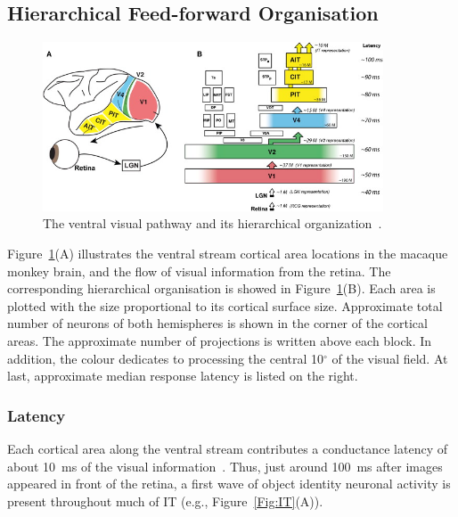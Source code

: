 \subsection{Hierarchical Feed-forward Organisation }

\begin{figure}[h!]
	\centering
	\includegraphics[width=0.9\textwidth]{pics/ventral.jpg}
	\caption{The ventral visual pathway and its hierarchical organization~\cite{dicarlo2012does}.
}
	\label{Fig:Ventral}
\end{figure}
Figure~\ref{Fig:Ventral}(A) illustrates the ventral stream cortical area locations in the macaque monkey brain, and the flow of visual information from the retina.
The corresponding hierarchical organisation is showed in Figure~\ref{Fig:Ventral}(B).
Each area is plotted with the size proportional to its cortical surface size.
Approximate total number of neurons of both hemispheres is shown in the corner of the cortical areas.
The approximate number of projections is written above each block.
In addition, the colour dedicates to processing the central 10$^\circ$ of the visual field.
At last, approximate median response latency is listed on the right.
\subsubsection{Latency}
Each cortical area along the ventral stream contributes a conductance latency of about 10~ms of the visual information~\cite{nowak1997timing}.
Thus, just around 100~ms after images appeared in front of the retina, a first wave of object identity neuronal activity is present throughout much of IT (e.g., Figure~\ref{Fig:IT}(A)).

